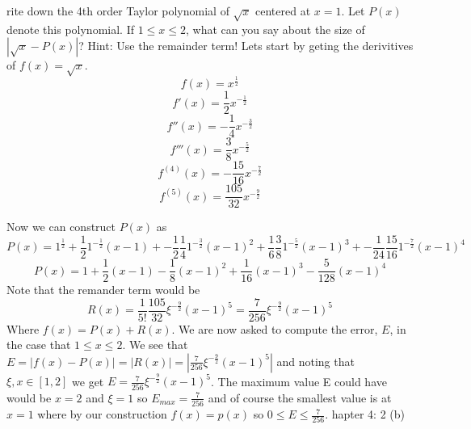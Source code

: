 \documentclass[12pt]{article}
\makeatletter
\theoremstyle{homework}
\newenvironment{exercise}[1]
{\def\@currentlabel{#1}\exercisecore}
{\endexercisecore}
\makeatother
\begin{document}
\begin{exercise}

Write down the 4th order Taylor polynomial of $\sqrt{
x}$ centered at $x = 1$. Let $P(x)$ denote
this polynomial. If $1 \leq x \leq 2$, what can you say about the size of $|\sqrt{x} - P(x)|$? Hint: Use
the remainder term!
\end{exercise}
Lets start by geting the derivitives of $f(x)=\sqrt{x}$.
$$f(x)=x^\frac{1}{2}$$
$$f'(x)=\frac{1}{2}x^{-\frac{1}{2}}$$
$$f''(x)=-\frac{1}{4}x^{-\frac{3}{2}}$$
$$f'''(x)=\frac{3}{8}x^{-\frac{5}{2}}$$
$$f^{(4)}(x)=-\frac{15}{16}x^{-\frac{7}{2}}$$
$$f^{(5)}(x)=\frac{105}{32}x^{-\frac{9}{2}}$$

Now we can construct $P(x)$ as 
$$P(x)=1^\frac{1}{2}+\frac{1}{2}1^{-\frac{1}{2}}(x-1)+-\frac{1}{2}\frac{1}{4}1^{-\frac{3}{2}}(x-1)^2+\frac{1}{6}\frac{3}{8}1^{-\frac{5}{2}}(x-1)^3+-\frac{1}{24}\frac{15}{16}1^{-\frac{7}{2}}(x-1)^4$$
$$P(x)=1+\frac{1}{2}(x-1)-\frac{1}{8}(x-1)^2+\frac{1}{16}(x-1)^3-\frac{5}{128}(x-1)^4$$
Note that the remander term would be
$$R(x)=\frac{1}{5!}\frac{105}{32}\xi^{-\frac{9}{2}}(x-1)^5=\frac{7}{256}\xi^{-\frac{9}{2}}(x-1)^5$$
Where $f(x)=P(x)+R(x)$.
We are now asked to compute the error, $E$, in the case that $1 \leq x \leq 2$. We see that $E=|f(x) - P(x)|=|R(x)|=|\frac{7}{256}\xi^{-\frac{9}{2}}(x-1)^5|$ and noting that $\xi,x\in [1,2]$ we get $E=\frac{7}{256}\xi^{-\frac{9}{2}}(x-1)^5$.  The maximum value E could have would be $x=2$ and $\xi=1$ so $E_{max}=\frac{7}{256}$ and of course the smallest value is at $x=1$ where by our construction $f(x)=p(x)$ so $0\leq E\leq \frac{7}{256}$.
\begin{exercise}

Chapter 4: 2 (b)
\end{exercise}

\end{document}
